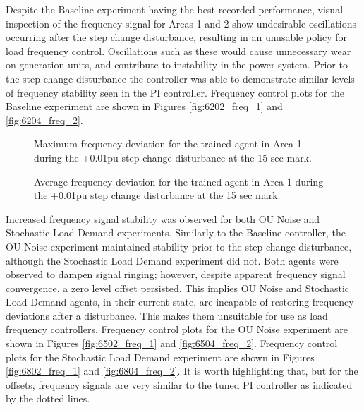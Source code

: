Despite the Baseline experiment having the best recorded performance, visual inspection of the frequency signal for Areas 1 and 2 show undesirable oscillations occurring after the step change disturbance, resulting in an unusable policy for load frequency control. Oscillations such as these would cause unnecessary wear on generation units, and contribute to instability in the power system. Prior to the step change disturbance the controller was able to demonstrate similar levels of frequency stability seen in the PI controller. Frequency control plots for the Baseline experiment are shown in Figures \ref{fig:6202_freq_1} and \ref{fig:6204_freq_2}.

\begin{figure}[h]
	\begin{minipage}[t]{0.50\textwidth}
		\centering
		\resizebox{7cm}{!}{}
		\caption[Maximum absolute frequency deviation comparison]{Maximum frequency deviation for the trained agent in Area 1 during the +0.01pu step change disturbance at the 15 sec mark.}\label{fig:7203_max_freq}
	\end{minipage}
	\hspace{0.25cm}
	\begin{minipage}[t]{0.50\textwidth}
		\resizebox{7cm}{!}{}
		\caption[Average absolute frequency deviation comparison]{Average frequency deviation for the trained agent in Area 1 during the +0.01pu step change disturbance at the 15 sec mark.}\label{fig:7204_avg_freq}
	\end{minipage}
\end{figure}

Increased frequency signal stability was observed for both OU Noise and Stochastic Load Demand experiments. Similarly to the Baseline controller, the OU Noise experiment maintained stability prior to the step change disturbance, although the Stochastic Load Demand experiment did not. Both agents were observed to dampen signal ringing; however, despite apparent frequency signal convergence, a zero level offset persisted. This implies OU Noise and Stochastic Load Demand agents, in their current state, are incapable of restoring frequency deviations after a disturbance. This makes them unsuitable for use as load frequency controllers. Frequency control plots for the OU Noise experiment are shown in Figures \ref{fig:6502_freq_1} and \ref{fig:6504_freq_2}. Frequency control plots for the Stochastic Load Demand experiment are shown in Figures \ref{fig:6802_freq_1} and \ref{fig:6804_freq_2}. It is worth highlighting that, but for the offsets, frequency signals are very similar to the tuned PI controller as indicated by the dotted lines.

